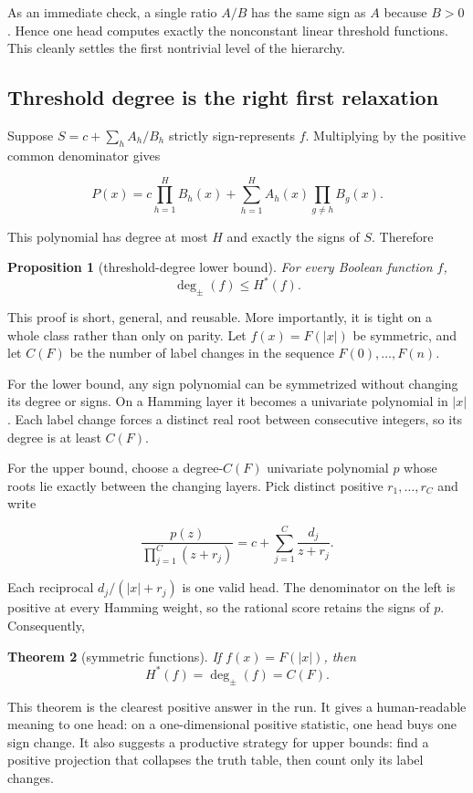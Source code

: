 \documentclass[10pt]{article}
\newtheorem{theorem}{Theorem}
\newtheorem{proposition}[theorem]{Proposition}
\theoremstyle{definition}
\theoremstyle{remark}
\newcommand{\Hstar}{H^{\ast}}
\newcommand{\tdeg}{\deg_{\pm}}
\begin{document}
As an immediate check, a single ratio $A/B$ has the same sign as $A$ because $B>0$.
Hence one head computes exactly the nonconstant linear threshold functions. This cleanly
settles the first nontrivial level of the hierarchy.

\subsection{Threshold degree is the right first relaxation}

Suppose $S=c+\sum_h A_h/B_h$ strictly sign-represents $f$. Multiplying by the
positive common denominator gives

\[
P(x)=c\prod_{h=1}^{H}B_h(x)
+\sum_{h=1}^{H}A_h(x)\prod_{g\neq h}B_g(x).
\]

This polynomial has degree at most $H$ and exactly the signs of $S$. Therefore

\begin{proposition}[threshold-degree lower bound]
For every Boolean function $f$,
\[
\tdeg(f)\leq \Hstar(f).
\]
\end{proposition}

This proof is short, general, and reusable. More importantly, it is tight on a whole
class rather than only on parity. Let $f(x)=F(|x|)$ be symmetric, and let $C(F)$ be
the number of label changes in the sequence $F(0),\ldots,F(n)$.

For the lower bound, any sign polynomial can be symmetrized without changing its degree
or signs. On a Hamming layer it becomes a univariate polynomial in $|x|$. Each label
change forces a distinct real root between consecutive integers, so its degree is at
least $C(F)$.

For the upper bound, choose a degree-$C(F)$ univariate polynomial $p$ whose roots lie
exactly between the changing layers. Pick distinct positive $r_1,\ldots,r_C$ and write

\[
\frac{p(z)}{\prod_{j=1}^{C}(z+r_j)}
=c+\sum_{j=1}^{C}\frac{d_j}{z+r_j}.
\]

Each reciprocal $d_j/(|x|+r_j)$ is one valid head. The denominator on the left is
positive at every Hamming weight, so the rational score retains the signs of $p$.
Consequently,

\begin{theorem}[symmetric functions]
If $f(x)=F(|x|)$, then
\[
\Hstar(f)=\tdeg(f)=C(F).
\]
\end{theorem}

This theorem is the clearest positive answer in the run. It gives a human-readable
meaning to one head: on a one-dimensional positive statistic, one head buys one sign
change. It also suggests a productive strategy for upper bounds: find a positive
projection that collapses the truth table, then count only its label changes.
\end{document}
